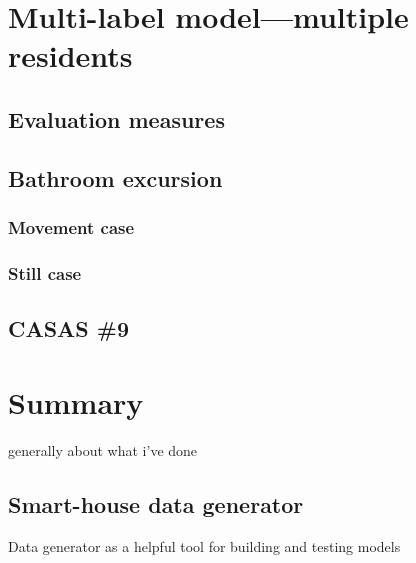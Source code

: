 \documentclass[12pt, a4paper, pdflatex, leqno, twoside, openright]{report}
\begin{document}
\chapter{Multi-label model---multiple residents\label{ch:mlm}}
  \section{Evaluation measures}
  \section{Bathroom excursion}
    \subsection{Movement case}
    \subsection{Still case}

  \section{CASAS \#9}


\chapter{Summary\label{ch:summary}}
generally about what i've done

  \section{Smart-house data generator}
Data generator as a helpful tool for building and testing models\\
\end{document}
